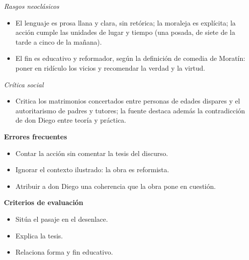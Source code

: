 \documentclass{book}
\begin{document}
\begin{tcolorbox}[title={Ejercicio resuelto}, studiumworked, breakable]
\noindent\textit{Rasgos neoclásicos}
\begin{itemize}
\item El lenguaje es prosa llana y clara, sin retórica; la moraleja es explícita; la acción cumple las unidades de lugar y tiempo (una posada, de siete de la tarde a cinco de la mañana).
\item El fin es educativo y reformador, según la definición de comedia de Moratín: poner en ridículo los vicios y recomendar la verdad y la virtud.
\end{itemize}

\noindent\textit{Crítica social}
\begin{itemize}
\item Critica los matrimonios concertados entre personas de edades dispares y el autoritarismo de padres y tutores; la fuente destaca además la contradicción de don Diego entre teoría y práctica.
\end{itemize}

\noindent\textbf{Errores frecuentes}
\begin{itemize}
\item Contar la acción sin comentar la tesis del discurso.
\item Ignorar el contexto ilustrado: la obra es reformista.
\item Atribuir a don Diego una coherencia que la obra pone en cuestión.
\end{itemize}

\noindent\textbf{Criterios de evaluación}
\begin{itemize}
\item Sitúa el pasaje en el desenlace.
\item Explica la tesis.
\item Relaciona forma y fin educativo.
\end{itemize}
\end{tcolorbox}
\end{document}
